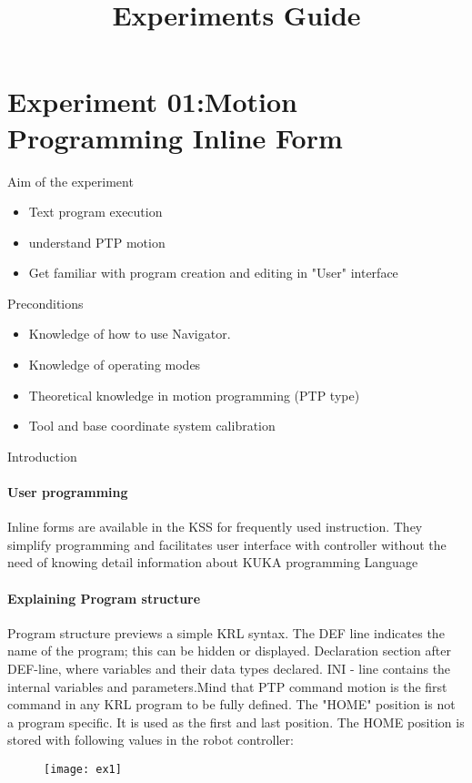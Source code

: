 \documentclass[]{book}
\title{Experiments Guide}
\begin{document}
\maketitle



\section{Experiment 01:Motion Programming Inline Form}
Aim of the experiment
\begin{itemize}
	\item Text program execution
	\item understand PTP motion
	\item Get familiar with program creation and editing in "User" interface
\end{itemize}
Preconditions
\begin{itemize}
	\item Knowledge of how to use Navigator.
	\item Knowledge of operating modes
	\item Theoretical knowledge in motion programming (PTP type)
	\item Tool and base coordinate system calibration
\end{itemize}
Introduction
\paragraph{User programming}
Inline forms are available in the KSS for frequently used instruction. They simplify programming and facilitates user interface with controller without the need of knowing detail information about KUKA programming Language
\paragraph{Explaining Program structure}
Program structure previews a simple KRL syntax. The DEF line indicates the name of the program; this can be hidden or displayed. Declaration section after DEF-line, where variables and their data types declared.
INI - line contains the internal variables and parameters.Mind that PTP command motion is the first command in any KRL program to be fully defined. The "HOME" position is not a program specific. It is used as the first and last position. The HOME position is stored with following values in the robot controller:
\begin{figure}[H]
	
	\texttt{[image: ex1]}
\end{figure}
\end{document}
